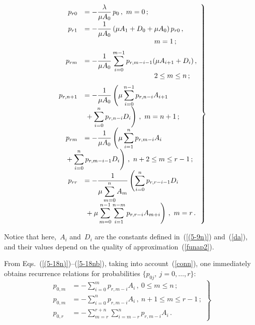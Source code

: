 \begin{multicols}{2}
\noindent
\begin{equation}
\label{fprj}
\left.
  \begin{array}{rl}
p_{r0}& = - \fr{\lambda}{\mu A_0}\, p_0 \,, \ m=0\,; \\[6pt]
p_{r1} &= -\fr{1}{\mu A_0} \left (
 \mu A_1+D_0 + \mu  A_0 \right ) p_{r0} \,, \\[6pt]
 &\hspace*{35mm} m=1\,; \\[6pt]
p_{rm} &=\displaystyle  -\fr{1}{\mu A_0} \sum\limits_{i=0}^{m-1} p_{r,m-i-1} 
(\mu A_{i+1} + D_i) \,, \\[6pt]
& \hspace*{35mm}2 \le m \le n\,; \\[6pt]
p_{r,n+1} &=\displaystyle-\fr{1}{\mu A_0} \left 
( \mu \sum\limits_{i=0}^{n-1} p_{r,n-i} A_{i+1}\right.\\[6pt]
&\left.{} +
\displaystyle\sum\limits_{i=0}^{n} p_{r,n-i} D_i \right )\,, \ m=n+1\,; \\[6pt]
p_{rm} &=\displaystyle-\fr{1}{\mu A_0} \left ( \mu \sum\limits_{i=1}^{n} p_{r,m-i} A_i\right.\\[6pt]
&\hspace*{-10mm}\left. {}  + \displaystyle\sum\limits_{i=0}^{n} p_{r,m-i-1} D_i \right )\,, \
n+2 \le m \le r-1\,; \\[6pt]
p_{rr} &=\displaystyle-\fr{1}{\mu \sum\limits_{m=0}^{n} A_{m}} \left (
\sum\limits_{i=0}^{n} p_{r,r-i-1} D_i\right.\\[6pt]
&\left.{} + \displaystyle\mu \sum\limits_{m=0}^{n-1} 
\sum\limits_{i=1}^{n-m} p_{r,r-i} A_{m+i} \right ) \,,\  m=r\,. 
  \end{array}
\right\}
\end{equation}


\noindent
Notice that here,~$A_i$ and~$D_i$
are the constants defined in~(\ref{(5-9n)}) and~(\ref{da}),
and their values depend on the quality of approximation~(\ref{funap2}).

From Eqs.~(\ref{(5-18n)})--(\ref{5-18nb}), taking into account~(\ref{conn}),
one immediately obtains
recurrence relations for probabilities $\{p_{0j}, \ j= 0 ,\dots , r \}$:
\begin{equation}
\label{ot2}
\left.
  \begin{array}{rl}
p_{0,m}&= \displaystyle- \sum\limits_{i=0}^m p_{r,m-i} A_i \,, \ 0 \le m \le n\,; \\[6pt]
p_{0,m}&= \displaystyle-  \sum\limits_{i=0}^n p_{r,m-i} A_i\,, \ n+1 \le m \le r-1\,; \\[6pt]
p_{0,r}& = \displaystyle - \sum\limits_{m=r}^{r+n} 
\sum\limits_{i=m-r}^n p_{r,m-i} A_i \,. 
  \end{array}
\right\}
\end{equation}


\end{multicols}
